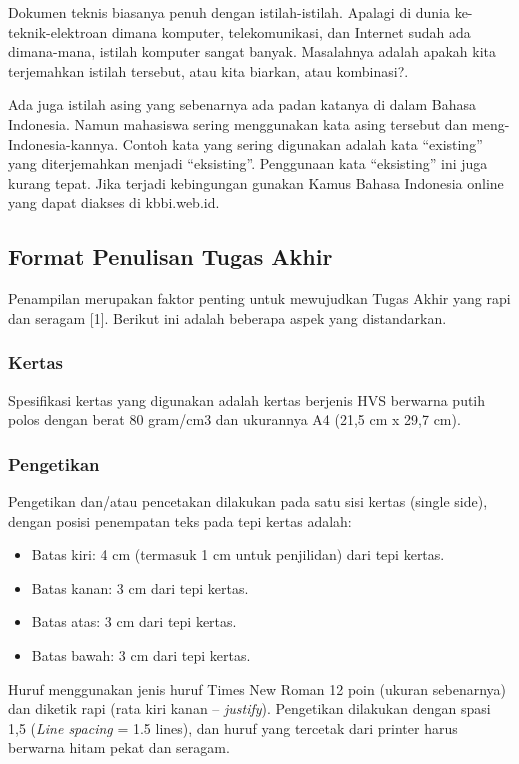 \documentclass{thesis}
\begin{document}
Dokumen teknis biasanya penuh dengan istilah-istilah. Apalagi di dunia ke-teknik-elektroan dimana komputer, telekomunikasi, dan Internet sudah ada dimana-mana, istilah komputer sangat banyak. Masalahnya adalah apakah kita terjemahkan istilah tersebut, atau kita biarkan, atau kombinasi?.

Ada juga istilah asing yang sebenarnya ada padan katanya di dalam Bahasa Indonesia. Namun mahasiswa sering menggunakan kata asing tersebut dan meng-Indonesia-kannya. Contoh kata yang sering digunakan adalah kata “existing” yang diterjemahkan menjadi “eksisting”. Penggunaan kata “eksisting” ini juga kurang tepat. Jika terjadi kebingungan gunakan Kamus Bahasa Indonesia online yang dapat diakses di kbbi.web.id.

\subsection{Format Penulisan Tugas Akhir}

Penampilan merupakan faktor penting untuk mewujudkan Tugas Akhir yang rapi dan seragam [1]. Berikut ini adalah beberapa aspek yang distandarkan.

\subsubsection{Kertas}

Spesifikasi kertas yang digunakan adalah kertas berjenis HVS berwarna putih polos dengan berat 80 gram/cm3 dan ukurannya A4 (21,5 cm x 29,7 cm).

\subsubsection{Pengetikan}

Pengetikan dan/atau pencetakan dilakukan pada satu sisi kertas (single side), dengan posisi penempatan teks pada tepi kertas adalah: 
\begin{itemize}
    \item Batas kiri: 4 cm (termasuk 1 cm untuk penjilidan) dari tepi kertas. 
    \item Batas kanan: 3 cm dari tepi kertas.
    \item Batas atas: 3 cm dari tepi kertas.
    \item Batas bawah: 3 cm dari tepi kertas. 
\end{itemize}

Huruf menggunakan jenis huruf Times New Roman 12 poin (ukuran sebenarnya) dan diketik rapi (rata kiri kanan – \textit{justify}). Pengetikan dilakukan dengan spasi 1,5 (\textit{Line spacing} = 1.5 lines), dan huruf yang tercetak dari printer harus berwarna hitam pekat dan seragam.
\end{document}
